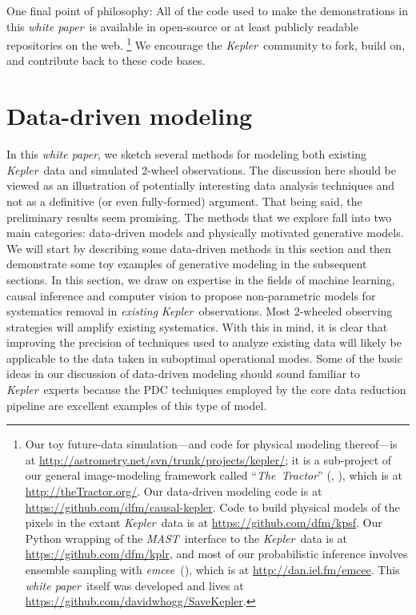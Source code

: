 \documentclass[letterpaper,12pt,whitepaper]{haastex}
\newcommand{\documentname}{\textsl{white paper}}
\newcommand{\observatory}[1]{\textsl{#1}}
\newcommand{\Kepler}{\observatory{Kepler}}
\newcommand{\project}[1]{\textsl{#1}}
\newcommand{\MAST}{\project{MAST}}
\newcommand{\TheTractor}{\project{The~Tractor}}
\newcommand{\emcee}{\project{emcee}}
\begin{document}
One final point of philosophy:
All of the code used to make the demonstrations in this \documentname\ is available
  in open-source or at least publicly readable repositories on the web.%
\footnote{Our toy future-data simulation---and code for physical modeling thereof---is at
  \url{http://astrometry.net/svn/trunk/projects/kepler/};
  it is a sub-project of our general image-modeling framework
  called ``\TheTractor'' (\citealt{hoggtractor}, \citealt{langtractor}), which is at
  \url{http://theTractor.org/}.
  Our data-driven modeling code is at
  \url{https://github.com/dfm/causal-kepler}.
  Code to build physical models of the pixels in the extant \Kepler\ data is at
  \url{https://github.com/dfm/kpsf}.
  Our Python wrapping of the \MAST\ interface to the \Kepler\ data is at
  \url{https://github.com/dfm/kplr},
  and most of our probabilistic inference involves ensemble sampling
  with \emcee\ (\citealt{emcee}), which is at
  \url{http://dan.iel.fm/emcee}.
  This \documentname\ itself was developed and lives at
  \url{https://github.com/davidwhogg/SaveKepler}.}
We encourage the \Kepler\ community to fork, build on, and contribute back to these code bases.

\section{Data-driven modeling}\label{sec:datadriven}

In this \documentname, we sketch several methods for modeling both existing
\Kepler\ data and simulated 2-wheel observations.
The discussion here should be viewed as an illustration of potentially
interesting data analysis techniques and not as a definitive (or even
fully-formed) argument.
That being said, the preliminary results seem promising.
The methods that we explore fall into two main categories: data-driven models
and physically motivated generative models.
We will start by describing some data-driven methods in this section and then
demonstrate some toy examples of generative modeling in the subsequent
sections.
In this section, we draw on expertise in the fields of machine learning,
causal inference and computer vision to propose non-parametric models for systematics removal in \emph{existing} \Kepler\ observations.
Most 2-wheeled observing strategies will amplify existing systematics.
With this in mind, it is clear that improving the precision of techniques used
to analyze existing data will likely be applicable to the data taken in
suboptimal operational modes.
Some of the basic ideas in our discussion of data-driven modeling should sound
familiar to \Kepler\ experts because the PDC techniques employed by the core
data reduction pipeline are excellent examples of this type of model.
\end{document}
